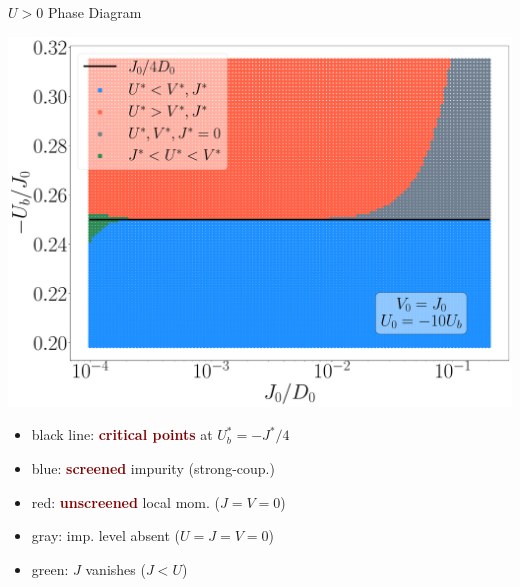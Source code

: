 \documentclass[aspectratio=169]{beamer}
\newcommand{\focus}[1]{\textcolor{maroon}{\textbf{#1}}}
\begin{document}
\begin{frame}[noframenumbering]{\(U > 0\) Phase Diagram}
\hspace*{-15pt}
\begin{minipage}{0.5\textwidth}
\includegraphics[width=\textwidth]{./figures/phase-map-MIT.pdf}
\end{minipage}
\begin{minipage}{0.52\textwidth}
	\begin{itemize}[<+->]
		\item black line: \focus{critical points} at \(U_b^* = -J^*/4\)\\[10pt]
		\item blue: \focus{screened} impurity (strong-coup.)\\[10pt]
		\item red: \focus{unscreened} local mom. (\(J=V=0\))\\[10pt]
	\item gray: imp. level absent (\(U=J=V=0\))\\[10pt]
	\item green: \(J\) vanishes (\(J < U\))
	\end{itemize}
\end{minipage}


\end{frame}
\end{document}
